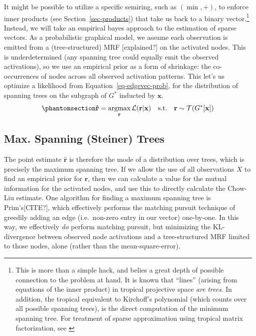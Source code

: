 \documentclass[%
	12pt,
		oneside,
		letterpaper
]{book}
\begin{document}
It might be possible to utilize a specific semiring, such as
\((\min,+)\), to enforce inner products (see Section~\ref{sec-products})
that take us back to a binary vector.\footnote{ This is more than a
  simple hack, and belies a great depth of possible connection to the
  problem at hand. It is known that ``lines'' (arising from equations of
  the inner product) in tropical projective space \emph{are
  trees}.\autocite{tropicalGrassmannian_2004} In addition, the tropical
  equivalent to Kirchoff's polynomial (which counts over all possible
  spanning trees), is the direct computation of the minimum spanning
  tree.\autocite{TropicalKirchhoffsformula_Jukna2021} For treatment of
  sparse approximation using tropical matrix factorization, see
  \textcite{Sparsedataembedding_Omanovic2021}} Instead, we will take an
empirical bayes approach to the estimation of sparse
vectors.\autocite{EmpiricalBayesianStrategy_Wipf2007} As a probabilistic
graphical model, we assume each observation is emitted from a
(tree-structured) MRF {[}explained?{]} on the activated nodes. This is
underdetermined (any spanning tree could equally emit the observed
activations), so we use an empirical prior as a form of shrinkage: the
co-occurrences of nodes across all observed activation patterns. This
let's us optimize a likelihood from Equation~\ref{eq-edgevec-prob}, for
the distribution of spanning trees on the subgraph of \(G^*\) inducted
by \(\mathbf{x}\).
\begin{equation}\phantomsection\label{eq-sparse-approx-tree}{
\mathbf{\hat{r}} = \operatorname*{argmax}_{\mathbf{r}}{\mathcal{L}(\mathbf{r}|\mathbf{x})} \quad \text{s.t.}\quad \mathbf{r}\sim \mathcal{T}(G^*[\mathbf{x}])
}\end{equation}

\subsection{Max. Spanning (Steiner) Trees}\label{sec-steiner}

The point estimate \(\hat{\mathbf{r}}\) is therefore the mode of a
distribution over trees, which is precisely the maximum spanning
tree.\autocite{EfficientComputationExpectations_Zmigrod2021} If we allow
the use of all observations \(X\) to find an empirical prior for
\(\mathbf{r}\), then we can calculate a value for the mutual information
for the activated nodes, and use this to directly calculate the Chow-Liu
estimate. One algorithm for finding a maximum spanning tree is
Prim's{[}CITE?{]}, which effectively performs the matching pursuit
technique of greedily adding an edge (i.e.~non-zero entry in our vector)
one-by-one. In this way, we effectively \emph{do} perform matching
pursuit, but minimizing the KL-divergence between observed node
activations and a tree-structured MRF limited to those nodes, alone
(rather than the mean-square-error).
\end{document}
